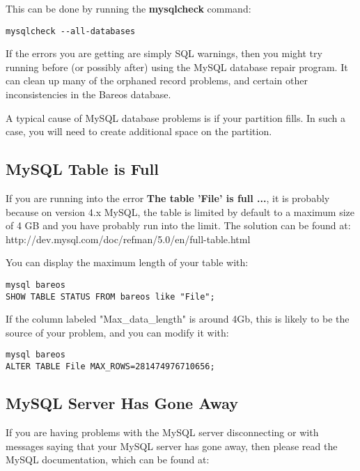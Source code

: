 This can be done by running the {\bf mysqlcheck } command:
\footnotesize
\begin{verbatim}
mysqlcheck --all-databases
\end{verbatim}
\normalsize

If the errors you are getting are simply SQL warnings, then you might try
running  before (or possibly after) using the MySQL database repair
program. It can clean up many of the orphaned record problems, and certain
other inconsistencies in the Bareos database.

A typical cause of MySQL database problems is if your partition fills. In
such a case, you will need to create additional space on the partition.



\subsection{MySQL Table is Full}

If you are running into the error {\bf The table 'File' is full ...},
it is probably because on version 4.x MySQL, the table is limited by
default to a maximum size of 4 GB and you have probably run into
the limit. The solution can be found at:
{http://dev.mysql.com/doc/refman/5.0/en/full-table.html}

You can display the maximum length of your table with:

\footnotesize
\begin{verbatim}
mysql bareos
SHOW TABLE STATUS FROM bareos like "File";
\end{verbatim}
\normalsize

If the column labeled "Max\_data\_length" is around 4Gb, this is likely
to be the source of your problem, and you can modify it with:

\footnotesize
\begin{verbatim}
mysql bareos
ALTER TABLE File MAX_ROWS=281474976710656;
\end{verbatim}
\normalsize


\subsection{MySQL Server Has Gone Away}
If you are having problems with the MySQL server disconnecting or with
messages saying that your MySQL server has gone away, then please read
the MySQL documentation, which can be found at:

